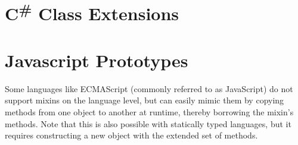 \section{C\textsuperscript{\#} Class Extensions}


\section{Javascript Prototypes}

Some languages like ECMAScript (commonly referred to as JavaScript) do not support mixins on the language level, but can easily mimic them by copying methods from one object to another at runtime, thereby borrowing the mixin's methods. Note that this is also possible with statically typed languages, but it requires constructing a new object with the extended set of methods.